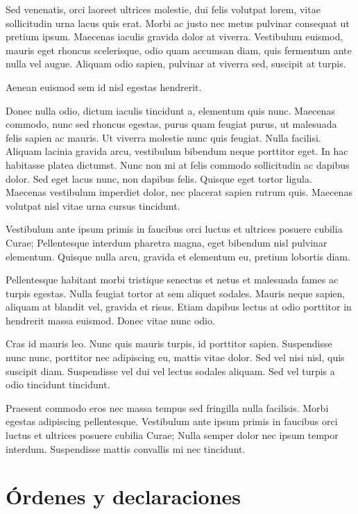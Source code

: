\documentclass[12pt,a4paper]{report}
\begin{document}
Sed venenatis, orci laoreet ultrices molestie, dui felis volutpat lorem, vitae sollicitudin urna lacus quis erat. Morbi ac justo nec metus pulvinar consequat ut pretium ipsum. Maecenas iaculis gravida dolor at viverra. Vestibulum euismod, mauris eget rhoncus scelerisque, odio quam accumsan diam, quis fermentum ante nulla vel augue. Aliquam odio sapien, pulvinar at viverra sed, suscipit at turpis. 

Aenean euismod sem id nisl egestas hendrerit.

Donec nulla odio, dictum iaculis tincidunt a, elementum quis nunc. Maecenas commodo, nunc sed rhoncus egestas, purus quam feugiat purus, ut malesuada felis sapien ac mauris. Ut viverra molestie nunc quis feugiat. Nulla facilisi. Aliquam lacinia gravida arcu, vestibulum bibendum neque porttitor eget. In hac habitasse platea dictumst. Nunc non mi at felis commodo sollicitudin ac dapibus dolor. Sed eget lacus nunc, non dapibus felis. Quisque eget tortor ligula. Maecenas vestibulum imperdiet dolor, nec placerat sapien rutrum quis. Maecenas volutpat nisl vitae urna cursus tincidunt. 

Vestibulum ante ipsum primis in faucibus orci luctus et ultrices posuere cubilia Curae; Pellentesque interdum pharetra magna, eget bibendum nisl pulvinar elementum. Quisque nulla arcu, gravida et elementum eu, pretium lobortis diam.

Pellentesque habitant morbi tristique senectus et netus et malesuada fames ac turpis egestas. Nulla feugiat tortor at sem aliquet sodales. Mauris neque sapien, aliquam at blandit vel, gravida et risus. Etiam dapibus lectus at odio porttitor in hendrerit massa euismod. Donec vitae nunc odio. 

Cras id mauris leo. Nunc quis mauris turpis, id porttitor sapien. Suspendisse nunc nunc, porttitor nec adipiscing eu, mattis vitae dolor. Sed vel nisi nisl, quis suscipit diam. Suspendisse vel dui vel lectus sodales aliquam. Sed vel turpis a odio tincidunt tincidunt.

Praesent commodo eros nec massa tempus sed fringilla nulla facilisis. Morbi egestas adipiscing pellentesque. Vestibulum ante ipsum primis in faucibus orci luctus et ultrices posuere cubilia Curae; Nulla semper dolor nec ipsum tempor interdum. Suspendisse mattis convallis mi nec tincidunt. 







\section{Órdenes y declaraciones}
\label{seccion.ordenes}
\end{document}
